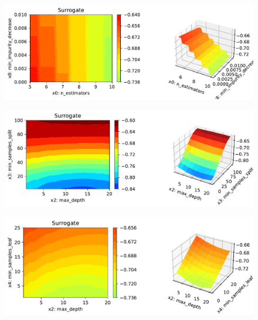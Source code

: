 \documentclass[
  letterpaper,
  DIV=11,
  numbers=noendperiod]{scrreprt}
\begin{document}
\begin{figure}[H]

{\centering \includegraphics{16_spot_hpt_sklearn_multiclass_classification_randomforest_files/figure-pdf/cell-48-output-6.pdf}

}

\end{figure}

\begin{figure}[H]

{\centering \includegraphics{16_spot_hpt_sklearn_multiclass_classification_randomforest_files/figure-pdf/cell-48-output-7.pdf}

}

\end{figure}

\begin{figure}[H]

{\centering \includegraphics{16_spot_hpt_sklearn_multiclass_classification_randomforest_files/figure-pdf/cell-48-output-8.pdf}

}

\end{figure}
\end{document}
